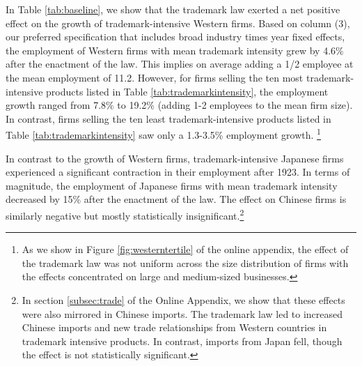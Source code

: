 \documentclass[12pt]{article}
\begin{document}

In Table \ref{tab:baseline}, we show that the trademark law exerted a net positive effect on the growth of trademark-intensive Western firms.  %
Based on column (3), our preferred specification that includes broad industry times year fixed effects, the employment of Western firms with mean trademark intensity grew by  4.6\% after the enactment of the law. This implies on average adding a 1/2 employee at the mean employment of 11.2. However, for firms selling the ten most trademark-intensive products listed in Table \ref{tab:trademarkintensity}, the employment growth ranged from 7.8\% to 19.2\% (adding 1-2 employees to the mean firm size). In contrast, firms selling the ten least trademark-intensive products listed in Table \ref{tab:trademarkintensity} saw only a 1.3-3.5\% employment growth. \footnote{As we show in Figure \ref{fig:westerntertile} of the online appendix, the effect of the trademark law was not uniform across the size distribution of firms with the effects concentrated on large and medium-sized businesses.} %

In contrast to the growth of Western firms, trademark-intensive Japanese firms  experienced a significant contraction in their employment after 1923. In terms of magnitude, the employment of Japanese firms with mean trademark intensity decreased by  15\% after the enactment of the law. The effect on Chinese firms is similarly negative but mostly statistically insignificant.\footnote{In section \ref{subsec:trade} of the Online Appendix, we show that these effects were also mirrored in Chinese imports. The trademark law led to increased Chinese imports and new trade relationships from Western countries in trademark intensive products. In contrast, imports from Japan fell, though the effect is not statistically significant.}
\end{document}
